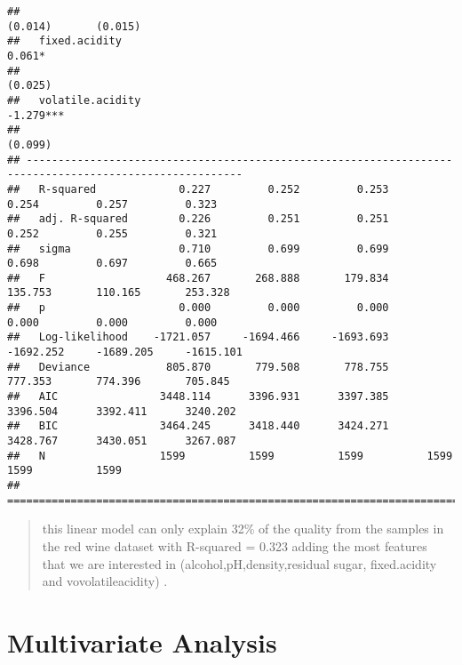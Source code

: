 \documentclass[]{article}
\begin{document}
\begin{verbatim}
##                                                                  (0.014)       (0.015)                  
##   fixed.acidity                                                                 0.061*                  
##                                                                                (0.025)                  
##   volatile.acidity                                                                           -1.279***  
##                                                                                              (0.099)    
## --------------------------------------------------------------------------------------------------------
##   R-squared             0.227         0.252         0.253         0.254         0.257         0.323     
##   adj. R-squared        0.226         0.251         0.251         0.252         0.255         0.321     
##   sigma                 0.710         0.699         0.699         0.698         0.697         0.665     
##   F                   468.267       268.888       179.834       135.753       110.165       253.328     
##   p                     0.000         0.000         0.000         0.000         0.000         0.000     
##   Log-likelihood    -1721.057     -1694.466     -1693.693     -1692.252     -1689.205     -1615.101     
##   Deviance            805.870       779.508       778.755       777.353       774.396       705.845     
##   AIC                3448.114      3396.931      3397.385      3396.504      3392.411      3240.202     
##   BIC                3464.245      3418.440      3424.271      3428.767      3430.051      3267.087     
##   N                  1599          1599          1599          1599          1599          1599         
## ========================================================================================================
\end{verbatim}

\begin{quote}
this linear model can only explain 32\% of the quality from the samples
in ~ the red wine dataset with R-squared = 0.323 adding the most
features\\
that we are interested in (alcohol,pH,density,residual sugar,
fixed.acidity and vovolatileacidity) .
\end{quote}

\section{Multivariate Analysis}\label{multivariate-analysis}
\end{document}
